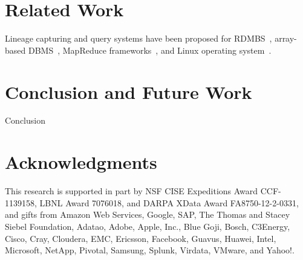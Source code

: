 \documentclass{sig-alternate}
\begin{document}
\section{Related Work}
\label{sec:Related}
Lineage capturing and query systems have been proposed for RDMBS~\cite{widom04}, array-based
DBMS~\cite{wu13}, MapReduce frameworks~\cite{ikeda11, logothetis13}, and Linux operating system~\cite{devecsery14}.


\section{Conclusion and Future Work}
\label{sec:Conclusion}
Conclusion

\section{Acknowledgments}
This research is supported in part by NSF CISE Expeditions Award CCF-1139158, LBNL Award 7076018, and DARPA XData Award FA8750-12-2-0331, and gifts from Amazon Web Services, Google, SAP,  The Thomas and Stacey Siebel Foundation, Adatao, Adobe, Apple, Inc., Blue Goji, Bosch, C3Energy, Cisco, Cray, Cloudera, EMC, Ericsson, Facebook, Guavus, Huawei, Intel, Microsoft, NetApp, Pivotal, Samsung, Splunk, Virdata, VMware, and Yahoo!. 

%

%
%



\balancecolumns

\end{document}
